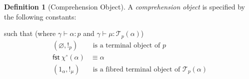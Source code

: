 \documentclass[10pt]{article}
\theoremstyle{definition}
\newtheorem{definition}{Definition}
\let\emptyset\varnothing
\newcommand\dsd[1]{\ensuremath{\mathsf{#1}}}
\newcommand{\yields}{\vdash}
\newcommand{\type}{\,\,\mathsf{mode}}
\newcommand\TypeTwo[4]{\ensuremath{#1 \mid #3 \vDash #2 : #4}}
\newcommand\TermTwoT[5]{\ensuremath{#1 \mid #3 \vDash_{#5} #2 : #4}}
\newcommand\TrCirc[2]{\ensuremath{{#1}^\circ(#2)}}
\newcommand\El[2]{\mathcal{T}_{#1}(#2)}
\newcommand{\app}[2]{\ensuremath{#1 \: #2}}
\newcommand{\sigmacl}[3]{\ensuremath{\textnormal{$\Sigma$}\,#1{:}#2.\,#3}}
\newcommand{\fst}[1]{\app{\dsd{fst}}{#1}}
\newcommand\bang[0]{\mathord{!}}
\begin{document}
\begin{definition}[Comprehension Object]
  A \emph{comprehension object} is specified by the following
  constants:
  such that (where $\gamma \yields \alpha : p$ and $\gamma \yields \mu : \El{p}{\alpha}$)
\begin{align}
\label{empty-terminal} 
(\emptyset, \bang_p) &\text{ is a terminal object of } p \\
\label{chi-section}
\fst{\TrCirc{\chi}{\alpha}} &\equiv \alpha \\
\label{one-terminal} 
(1_\alpha, !_\mu) &\text{ is a fibred terminal object of } \El{p}{\alpha} 
\end{align}
  

\end{definition}
\end{document}
